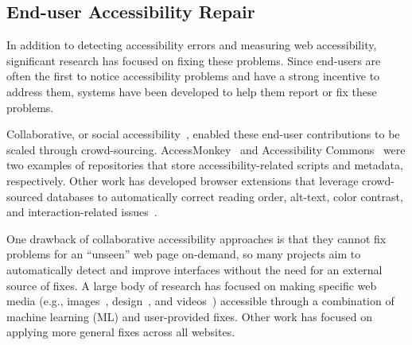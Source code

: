 \begin{highlight}
{%



\subsection{End-user Accessibility Repair}
In addition to detecting accessibility errors and measuring web accessibility, significant research has focused on fixing these problems.
Since end-users are often the first to notice accessibility problems and have a strong incentive to address them, systems have been developed to help them report or fix these problems.

Collaborative, or social accessibility~\cite{takagi2009collaborative,sato2010social}, enabled these end-user contributions to be scaled through crowd-sourcing.
AccessMonkey~\cite{bigham2007accessmonkey} and Accessibility Commons~\cite{kawanaka2008accessibility} were two examples of repositories that store accessibility-related scripts and metadata, respectively.
Other work has developed browser extensions that leverage crowd-sourced databases to automatically correct reading order, alt-text, color contrast, and interaction-related issues~\cite{sato2009s,huang2015can}.

One drawback of collaborative accessibility approaches is that they cannot fix problems for an ``unseen'' web page on-demand, so many projects aim to automatically detect and improve interfaces without the need for an external source of fixes.
A large body of research has focused on making specific web media (e.g., images~\cite{gleason2019making,guinness2018caption, twitterally, gleason2020making, lee2021image}, design~\cite{potluri2019ai,li2019editing, peng2022diffscriber, peng2023slide}, and videos~\cite{pavel2020rescribe,peng2021say,peng2021slidecho,huh2023avscript}) accessible through a combination of machine learning (ML) and user-provided fixes.
Other work has focused on applying more general fixes across all websites.

}
\end{highlight}
